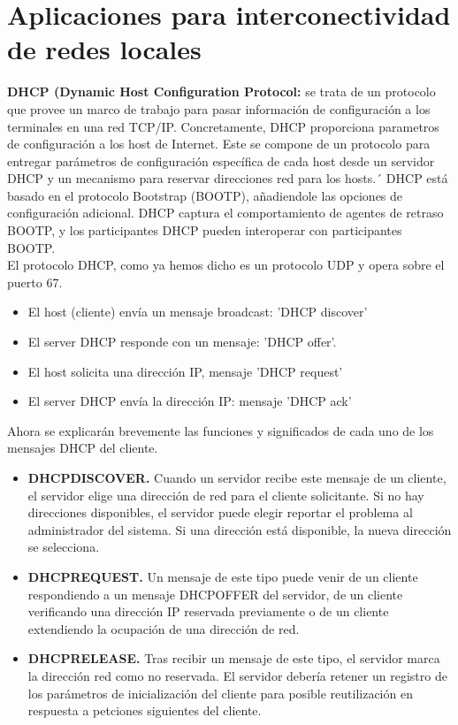 \documentclass[a4paper,11pt]{article}
\begin{document}
\section{Aplicaciones para interconectividad de redes locales}
\textbf{DHCP (Dynamic Host Configuration Protocol:} se trata de un protocolo que provee un marco de trabajo para pasar información de configuración a los terminales en una red TCP/IP. Concretamente, DHCP proporciona parametros de configuración a los host de Internet. Este se compone de un protocolo para entregar parámetros de configuración específica de cada host desde un servidor DHCP y un mecanismo para reservar direcciones red para los hosts.´  DHCP está basado en el protocolo Bootstrap (BOOTP), añadiendole las opciones de configuración adicional. DHCP captura el comportamiento de agentes de retraso BOOTP, y los participantes DHCP pueden interoperar con participantes BOOTP. \\

El protocolo DHCP, como ya hemos dicho es un protocolo UDP y opera sobre el puerto 67.

\begin{itemize}
\item El host (cliente) envía un mensaje broadcast: 'DHCP discover'
\item El server DHCP responde con un mensaje: 'DHCP offer'.
\item El host solicita una dirección IP, mensaje 'DHCP request'
\item El server DHCP envía la dirección IP: mensaje 'DHCP ack'
\end{itemize}

Ahora se explicarán brevemente las funciones y significados de cada uno de los mensajes DHCP del cliente.

\begin{itemize}
\item \textbf{DHCPDISCOVER.} Cuando un servidor recibe este mensaje de un cliente, el servidor elige una dirección de red para el cliente solicitante. Si no hay direcciones disponibles, el servidor puede elegir reportar el problema al administrador del sistema. Si una dirección está disponible, la nueva dirección se selecciona.

\item \textbf{DHCPREQUEST.} Un mensaje de este tipo puede venir de un cliente respondiendo a un mensaje DHCPOFFER del servidor, de un cliente verificando una dirección IP reservada previamente o de un cliente extendiendo la ocupación de una dirección de red. 

\item \textbf{DHCPRELEASE.} Tras recibir un mensaje de este tipo, el servidor marca la dirección red como no reservada. El servidor debería retener un registro de los parámetros de inicialización del cliente para posible reutilización en respuesta a petciones siguientes del cliente.
\end{itemize}
\end{document}
